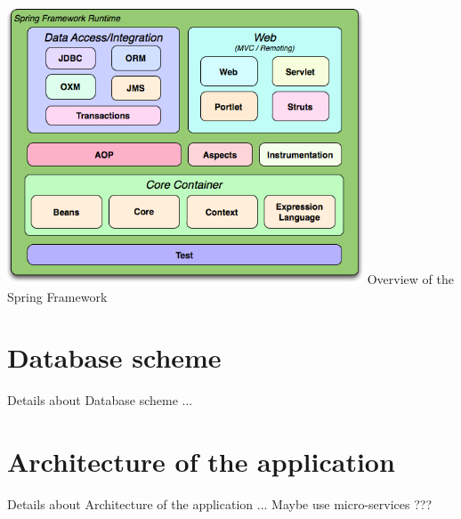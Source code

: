 \begin{center}
\includegraphics[width=300pt]{spring modules.PNG} 
\newline Overview of the Spring Framework
\end{center}

\section {Database scheme}
\tab Details about Database scheme ...
\newline

\section {Architecture of the application}
\tab Details about Architecture of the application ... \newline
\tab Maybe use micro-services ??? 

